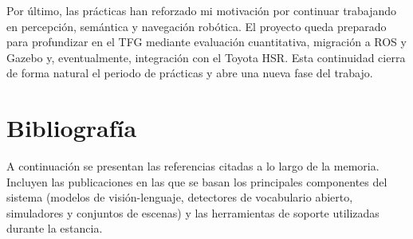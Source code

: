 \documentclass[11pt,fleqn,openany]{book} %
\begin{document}
Por último, las prácticas han reforzado mi motivación por continuar trabajando en percepción, semántica y navegación robótica. El proyecto queda preparado para profundizar en el TFG mediante evaluación cuantitativa, migración a ROS y Gazebo y, eventualmente, integración con el Toyota HSR. Esta continuidad cierra de forma natural el periodo de prácticas y abre una nueva fase del trabajo.



\chapter{Bibliografía}

A continuación se presentan las referencias citadas a lo largo de la memoria. Incluyen las publicaciones en las que se basan los principales componentes del sistema (modelos de visión-lenguaje, detectores de vocabulario abierto, simuladores y conjuntos de escenas) y las herramientas de soporte utilizadas durante la estancia.

\nocite{huang2023vlmaps}
\nocite{chang2017matterport3d}
\nocite{wang2025yoloe}
\nocite{radford2021clip}
\nocite{li2022lseg}
\nocite{savva2019habitat}
\nocite{szot2021habitat2}
\nocite{khanna2024hssd}
\nocite{honerkamp2024moma}
\nocite{quigley2009ros}
\nocite{koenig2004gazebo}
\nocite{yamamoto2019hsr}
\nocite{crick2017rosbridge}
\nocite{wada2016labelme}
\nocite{docker2013}
\nocite{nvidia2007cuda}

\printbibliography[heading=bibempty]

\end{document}
